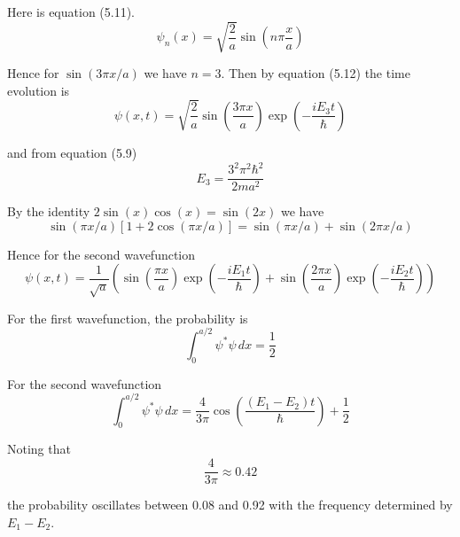 


\bigskip
Here is equation (5.11).
\begin{equation*}
\psi_n(x)=\sqrt{\frac{2}{a}}\sin\left(n\pi\frac{x}{a}\right)
\tag{5.11}
\end{equation*}

Hence for $\sin(3\pi x/a)$ we have $n=3$.
Then by equation (5.12) the time evolution is
\begin{equation*}
\psi(x,t)=\sqrt{\frac{2}{a}}\sin\left(\frac{3\pi x}{a}\right)
\exp\left(-\frac{iE_3t}{\hbar}\right)
\end{equation*}

and from equation (5.9)
\begin{equation*}
E_3=\frac{3^2\pi^2\hbar^2}{2ma^2}
\end{equation*}

By the identity $2\sin(x)\cos(x)=\sin(2x)$ we have
\begin{equation*}
\sin(\pi x/a)[1+2\cos(\pi x/a)]
=\sin(\pi x/a)+\sin(2\pi x/a)
\end{equation*}

Hence for the second wavefunction
\begin{equation*}
\psi(x,t)=\frac{1}{\sqrt a}\left(
\sin\left(\frac{\pi x}{a}\right)
\exp\left(-\frac{iE_1t}{\hbar}\right)
+\sin\left(\frac{2\pi x}{a}\right)
\exp\left(-\frac{iE_2t}{\hbar}\right)
\right)
\end{equation*}

For the first wavefunction, the probability is
\begin{equation*}
\int_0^{a/2}\psi^*\psi\,dx=\frac{1}{2}
\end{equation*}

For the second wavefunction
\begin{equation*}
\int_0^{a/2}\psi^*\psi\,dx=\frac{4}{3\pi}
\cos\left(\frac{(E_1-E_2)t}{\hbar}\right)+\frac{1}{2}
\end{equation*}

Noting that
\begin{equation*}
\frac{4}{3\pi}\approx0.42
\end{equation*}

the probability oscillates between 0.08 and 0.92 with the
frequency determined by $E_1-E_2$.


